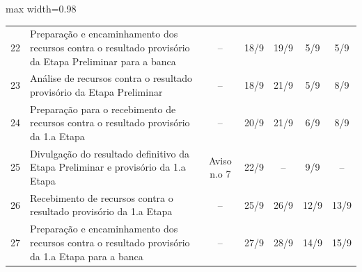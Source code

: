\begin{landscape}
\begin{quadro}[htb]
\begin{adjustbox}{max width=0.98\linewidth}
\begin{tabular}{|c|l|c|c|c|c|c|}
22 & Preparação e   encaminhamento dos recursos contra o resultado provisório da Etapa Preliminar   para a banca                                & –                   & 18/9                                                                            & 19/9                                  & 5/9                                                                             & 5/9                  \\
\rowcolor[HTML]{FCD5B4} 
23 & Análise de recursos   contra o resultado provisório da Etapa Preliminar                                                                    & –                   & 18/9                                                                            & 21/9                                  & 5/9                                                                             & 8/9                  \\
24 & Preparação para o   recebimento de recursos contra o resultado provisório da 1.a Etapa                                                     & –                   & 20/9                                                                            & 21/9                                  & 6/9                                                                             & 8/9                  \\
\rowcolor[HTML]{92CDDC} 
25 & Divulgação do   resultado definitivo da Etapa Preliminar e provisório da 1.a Etapa                                                         & Aviso n.o 7         & 22/9                                                                            & –                                     & 9/9                                                                             & –                    \\
26 & Recebimento de   recursos contra o resultado provisório da 1.a Etapa                                                                       & –                   & 25/9                                                                            & 26/9                                  & 12/9                                                                            & 13/9                 \\
27 & Preparação e   encaminhamento dos recursos contra o resultado provisório da 1.a Etapa para a   banca                                       & –                   & 27/9                                                                            & 28/9                                  & 14/9                                                                            & 15/9                 \\

\end{tabular}
\end{adjustbox}
\end{quadro}
\end{landscape}
